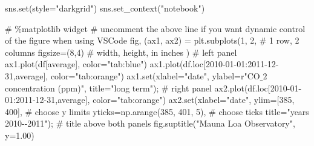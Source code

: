 \documentclass[
  letterpaper,
  DIV=11,
  numbers=noendperiod]{scrreprt}
\newenvironment{Shaded}{\begin{snugshade}}{\end{snugshade}}
\newcommand{\BuiltInTok}[1]{\textcolor[rgb]{0.00,0.23,0.31}{#1}}
\newcommand{\CommentTok}[1]{\textcolor[rgb]{0.37,0.37,0.37}{#1}}
\newcommand{\DecValTok}[1]{\textcolor[rgb]{0.68,0.00,0.00}{#1}}
\newcommand{\FloatTok}[1]{\textcolor[rgb]{0.68,0.00,0.00}{#1}}
\newcommand{\NormalTok}[1]{\textcolor[rgb]{0.00,0.23,0.31}{#1}}
\newcommand{\OperatorTok}[1]{\textcolor[rgb]{0.37,0.37,0.37}{#1}}
\newcommand{\StringTok}[1]{\textcolor[rgb]{0.13,0.47,0.30}{#1}}
\newcommand{\VerbatimStringTok}[1]{\textcolor[rgb]{0.13,0.47,0.30}{#1}}
\begin{document}
\begin{Shaded}
\begin{Highlighting}[]
\NormalTok{sns.}\BuiltInTok{set}\NormalTok{(style}\OperatorTok{=}\StringTok{"darkgrid"}\NormalTok{)}
\NormalTok{sns.set\_context(}\StringTok{"notebook"}\NormalTok{)}

\CommentTok{\# \%matplotlib widget}
\CommentTok{\# uncomment the above line if you want dynamic control of the figure when using VSCode}
\NormalTok{fig, (ax1, ax2) }\OperatorTok{=}\NormalTok{ plt.subplots(}\DecValTok{1}\NormalTok{, }\DecValTok{2}\NormalTok{,  }\CommentTok{\# 1 row, 2 columns}
\NormalTok{                               figsize}\OperatorTok{=}\NormalTok{(}\DecValTok{8}\NormalTok{,}\DecValTok{4}\NormalTok{)  }\CommentTok{\# width, height, in inches}
\NormalTok{                               )}
\CommentTok{\# left panel}
\NormalTok{ax1.plot(df[}\StringTok{\textquotesingle{}average\textquotesingle{}}\NormalTok{], color}\OperatorTok{=}\StringTok{"tab:blue"}\NormalTok{)}
\NormalTok{ax1.plot(df.loc[}\StringTok{\textquotesingle{}2010{-}01{-}01\textquotesingle{}}\NormalTok{:}\StringTok{\textquotesingle{}2011{-}12{-}31\textquotesingle{}}\NormalTok{,}\StringTok{\textquotesingle{}average\textquotesingle{}}\NormalTok{], color}\OperatorTok{=}\StringTok{"tab:orange"}\NormalTok{)}
\NormalTok{ax1.}\BuiltInTok{set}\NormalTok{(xlabel}\OperatorTok{=}\StringTok{"date"}\NormalTok{,}
\NormalTok{       ylabel}\OperatorTok{=}\VerbatimStringTok{r"CO$\_2$ concentration (ppm)"}\NormalTok{,}
\NormalTok{       title}\OperatorTok{=}\StringTok{"long term"}\NormalTok{)}\OperatorTok{;}
\CommentTok{\# right panel}
\NormalTok{ax2.plot(df.loc[}\StringTok{\textquotesingle{}2010{-}01{-}01\textquotesingle{}}\NormalTok{:}\StringTok{\textquotesingle{}2011{-}12{-}31\textquotesingle{}}\NormalTok{,}\StringTok{\textquotesingle{}average\textquotesingle{}}\NormalTok{], color}\OperatorTok{=}\StringTok{"tab:orange"}\NormalTok{)}
\NormalTok{ax2.}\BuiltInTok{set}\NormalTok{(xlabel}\OperatorTok{=}\StringTok{"date"}\NormalTok{,}
\NormalTok{        ylim}\OperatorTok{=}\NormalTok{[}\DecValTok{385}\NormalTok{, }\DecValTok{400}\NormalTok{],  }\CommentTok{\# choose y limits}
\NormalTok{        yticks}\OperatorTok{=}\NormalTok{np.arange(}\DecValTok{385}\NormalTok{, }\DecValTok{401}\NormalTok{, }\DecValTok{5}\NormalTok{),  }\CommentTok{\# choose ticks}
\NormalTok{        title}\OperatorTok{=}\StringTok{"years 2010{-}{-}2011"}\NormalTok{)}\OperatorTok{;}
\CommentTok{\# title above both panels}
\NormalTok{fig.suptitle(}\StringTok{"Mauna Loa Observatory"}\NormalTok{, y}\OperatorTok{=}\FloatTok{1.00}\NormalTok{)}


\end{Highlighting}
\end{Shaded}
\end{document}
